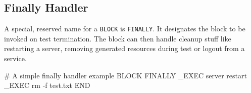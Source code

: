 \pagebreak 
\subsection{Finally Handler}
A special, reserved name for a \texttt{BLOCK} is \texttt{FINALLY}. It 
designates the block to be invoked on test termination.  The block can 
then handle cleanup stuff like restarting a server, removing generated
resources during test or logout from a service.
\begin{usplisting}
    # A simple finally handler example
    BLOCK FINALLY
    _EXEC server restart
    _EXEC rm -f test.txt
    END
\end{usplisting}

